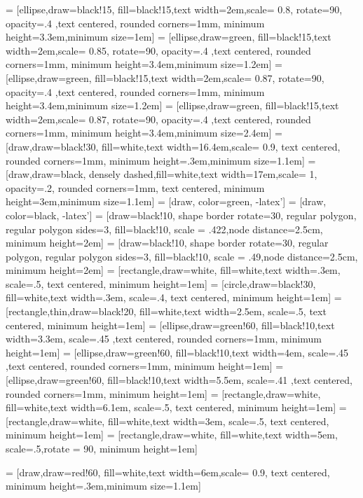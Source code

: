 \usepackage{lineno}


\usepackage{tikz}
\usetikzlibrary{shapes,arrows}
\usetikzlibrary{positioning,shadows,arrows}
\usetikzlibrary{calc}
 = [ellipse,draw=black!15, fill=black!15,text width=2em,scale= 0.8, rotate=90, opacity=.4 ,text centered, rounded corners=1mm, minimum height=3.3em,minimum size=1em]
 = [ellipse,draw=green, fill=black!15,text width=2em,scale= 0.85, rotate=90, opacity=.4 ,text centered, rounded corners=1mm, minimum height=3.4em,minimum size=1.2em]
 = [ellipse,draw=green, fill=black!15,text width=2em,scale= 0.87, rotate=90, opacity=.4 ,text centered, rounded corners=1mm, minimum height=3.4em,minimum size=1.2em]
 = [ellipse,draw=green, fill=black!15,text width=2em,scale= 0.87, rotate=90, opacity=.4 ,text centered, rounded corners=1mm, minimum height=3.4em,minimum size=2.4em]
 = [draw,draw=black!30, fill=white,text width=16.4em,scale= 0.9, text centered, rounded corners=1mm, minimum height=.3em,minimum size=1.1em]
 = [draw,draw=black, densely dashed,fill=white,text width=17em,scale= 1, opacity=.2, rounded corners=1mm, text centered, minimum height=3em,minimum size=1.1em]
 = [draw,  color=green, -latex']
 = [draw,  color=black, -latex']
 = [draw=black!10, shape border rotate=30, regular polygon, regular polygon sides=3, fill=black!10, scale = .422,node distance=2.5cm, minimum height=2em]
 = [draw=black!10, shape border rotate=30, regular polygon, regular polygon sides=3, fill=black!10, scale = .49,node distance=2.5cm, minimum height=2em]
 = [rectangle,draw=white, fill=white,text width=.3em, scale=.5, text centered, minimum height=1em]
 = [circle,draw=black!30, fill=white,text width=.3em, scale=.4, text centered, minimum height=1em]
 = [rectangle,thin,draw=black!20, fill=white,text width=2.5em, scale=.5, text centered, minimum height=1em]
 = [ellipse,draw=green!60, fill=black!10,text width=3.3em, scale=.45 ,text centered, rounded corners=1mm, minimum height=1em]
 = [ellipse,draw=green!60, fill=black!10,text width=4em, scale=.45 ,text centered, rounded corners=1mm, minimum height=1em]
 = [ellipse,draw=green!60, fill=black!10,text width=5.5em, scale=.41 ,text centered, rounded corners=1mm, minimum height=1em]
 = [rectangle,draw=white, fill=white,text width=6.1em, scale=.5, text centered, minimum height=1em]
 = [rectangle,draw=white, fill=white,text width=3em, scale=.5, text centered, minimum height=1em]
 = [rectangle,draw=white, fill=white,text width=5em, scale=.5,rotate = 90, minimum height=1em]

 = [draw,draw=red!60, fill=white,text width=6em,scale= 0.9, text centered, minimum height=.3em,minimum size=1.1em]
